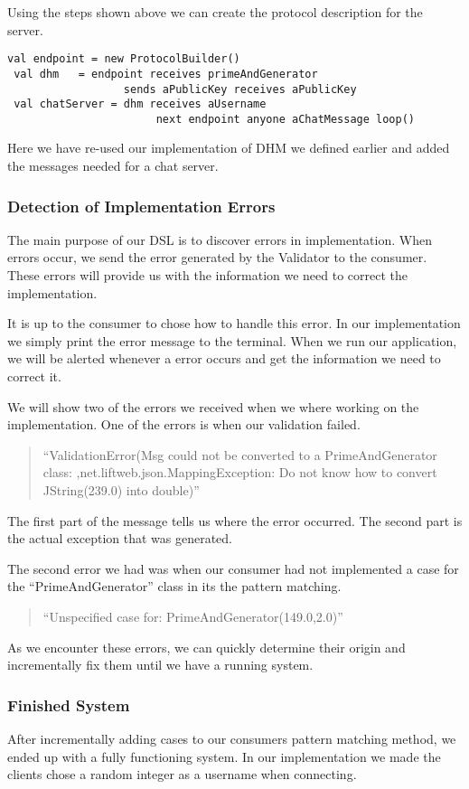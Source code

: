 Using the steps shown above we can create the protocol description for the server. 
\begin{lstlisting}[style=myScalastyle]
 val endpoint = new ProtocolBuilder()
 val dhm   = endpoint receives primeAndGenerator 
                  sends aPublicKey receives aPublicKey
 val chatServer = dhm receives aUsername 
                       next endpoint anyone aChatMessage loop()
\end{lstlisting}
Here we have re-used our implementation of DHM we defined earlier and added the messages needed for a chat server.

\subsubsection{Detection of Implementation Errors}
The main purpose of our DSL is to discover errors in implementation. When errors occur, we send the error generated by the Validator to the consumer. These errors will provide us with the information  we need to correct the implementation. 

It is up to the consumer to chose how to handle this error. In our implementation we simply print the error message to the terminal. When we run our application, we will be alerted whenever a error occurs and get the information we need to correct it.

We will show two of the errors we received when we where working on the implementation. One of the errors is when our validation failed. 
\begin{quote}
  ``ValidationError(Msg could not be converted to a PrimeAndGenerator class: ,net.liftweb.json.MappingException: Do not know how to convert JString(239.0) into double)''
\end{quote}
The first part of the message tells us where the error occurred. The second part is the actual exception that was generated.  

The second error we had was when our consumer had not implemented a case for the ``PrimeAndGenerator'' class in its the pattern matching.
\begin{quote}
  ``Unspecified case for: PrimeAndGenerator(149.0,2.0)''
\end{quote}

As we encounter these errors, we can quickly determine their origin and incrementally fix them until we have a running system.

\subsubsection{Finished System}
After incrementally adding cases to our consumers pattern matching method, we ended up with a fully functioning system. In our implementation we made the clients chose a random integer as a username when connecting. 

